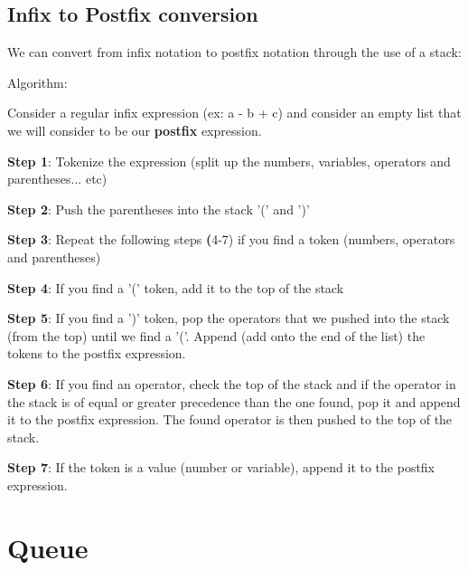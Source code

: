 \documentclass[11pt,a4paper,english]{paper}
\begin{document}
\subsection{Infix to Postfix conversion}

We can convert from infix notation to postfix notation through the use of a stack:
\bigskip

\begin{bbox}{Algorithm:} {

  Consider a regular infix expression (ex: a - b + c) and consider an empty list that we will consider to be our \textbf{postfix} expression.

  \bigskip
    \begin{itemize} {
        \item \textbf{Step 1}: Tokenize the expression (split up the numbers, variables, operators and parentheses... etc)

  \item \textbf{Step 2}: Push the parentheses into the stack '(' and ')'

  \item \textbf{Step 3}: Repeat the following steps \textbf(4-7) if you find a token (numbers, operators and parentheses)

  \item \textbf{Step 4}: If you find a '(' token, add it to the top of the stack

  \item \textbf{Step 5}: If you find a ')' token, pop the operators that we pushed into the stack (from the top) until we find a '('. Append (add onto the end of the list) the tokens to the postfix expression.

  \item \textbf{Step 6}: If you find an operator, check the top of the stack and if the operator in the stack is of equal or greater precedence than the one found, pop it and append it to the postfix expression. The found operator is then pushed to the top of the stack.

  \item \textbf{Step 7}: If the token is a value (number or variable), append it to the postfix expression.
}\end{itemize}
  \bigskip


}\end{bbox}

\section{Queue}
\end{document}
